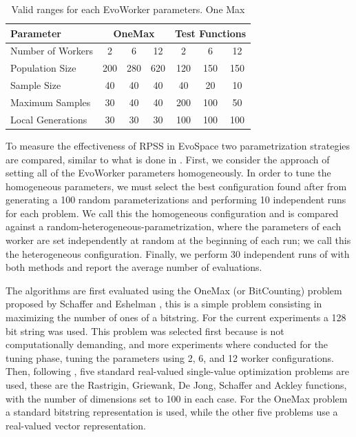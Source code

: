 \documentclass{llncs}
\begin{document}
\begin{table}[!t]
\caption{Valid ranges for each EvoWorker parameters. One Max}
\label{tab:params}
\centering
\begin{tabular}{|l|c|c|c|c|c|c| }
\hline
\textbf{Parameter} & \multicolumn{3}{|c|}{OneMax} & \multicolumn{3}{|c|}{Test Functions} \\
\hline
Number of Workers & 2 & 6 & 12 & 2 & 6 & 12\\
\hline
\hline
Population Size & 200 & 280 & 620 & 120 & 150 & 150\\
\hline
Sample Size & 40 & 40 & 40 & 40 & 20 & 10\\
\hline
Maximum Samples & 30 & 40 & 40 & 200 & 100 & 50\\
\hline
Local Generations & 30 & 30 & 30 & 100 & 100 & 100\\
\hline
\end{tabular}
\end{table}

To measure the effectiveness of RPSS in EvoSpace two parametrization strategies are compared, 
similar to what is done in \cite{fuku1,fuku2}. First, we consider the approach of setting all 
of the EvoWorker parameters homogeneously. In order to tune the homogeneous parameters,
we must select the best configuration found after from generating a 100 random parameterizations 
and performing 10 independent runs for each problem. We call this the homogeneous configuration and 
is compared against a random-heterogeneous-parametrization, where the parameters of each worker are 
set independently at random at the beginning of each run; we call this the heterogeneous configuration.
Finally, we perform 30 independent runs of with both methods and report the average number of evaluations.

The algorithms are first evaluated using the OneMax (or BitCounting) problem proposed by 
Schaffer and Eshelman \cite{SE91}, this is a simple problem consisting in maximizing the number 
of ones of a bitstring. For the current experiments a 128 bit string was used. This problem was
selected first because is not computationally demanding, and more experiments where conducted for
the tuning phase, tuning the parameters using 2, 6, and 12 worker configurations. 
Then, following \cite{fuku1}, five standard real-valued single-value optimization problems 
are used, these are the Rastrigin, Griewank, De Jong, Schaffer  and Ackley functions, 
with the number of dimensions set to 100 in each case. For the OneMax problem a standard bitstring 
representation is used, while the other five problems use a real-valued vector representation.
\end{document}
